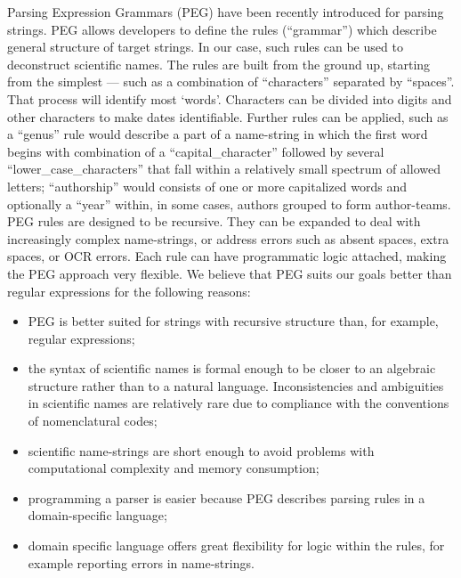 \documentclass{bmcart}
\begin{document}
Parsing Expression Grammars (PEG) \cite{Ford2004} have been recently introduced
for parsing strings. PEG allows developers to define the rules (``grammar'')
which describe general structure of target strings. In our case, such rules can
be used to deconstruct scientific names. The rules are built from the ground
up, starting from the simplest --- such as a combination of ``characters''
separated by ``spaces''. That process will identify most `words'. Characters
can be divided into digits and other characters to make dates identifiable.
Further rules can be applied, such as a ``genus'' rule would describe a part of
a name-string in which the first word begins with combination of a
``capital\_character'' followed by several ``lower\_case\_characters'' that
fall within a relatively small spectrum of allowed letters; ``authorship''
would consists of one or more capitalized words and optionally a ``year''
within, in some cases, authors grouped to form author-teams. PEG rules are
designed to be recursive. They can be expanded to deal with increasingly
complex name-strings, or address errors such as absent spaces, extra spaces, or
OCR errors. Each rule can have programmatic logic attached, making the PEG
approach very flexible. We believe that PEG suits our goals better than regular
expressions for the following reasons:

\begin{itemize}

  \item PEG is better suited for strings with recursive structure than, for
    example, regular expressions;

  \item the syntax of scientific names is formal enough to be closer to an
    algebraic structure rather than to a natural language. Inconsistencies and
    ambiguities in scientific names are relatively rare due to compliance with
    the conventions of nomenclatural codes;

  \item scientific name-strings are short enough to avoid problems with
    computational complexity and memory consumption;

  \item programming a parser is easier because PEG describes parsing rules in
    a domain-specific language;

  \item domain specific language offers great flexibility for logic within the
    rules, for example reporting errors in name-strings.

\end{itemize}
\end{document}
